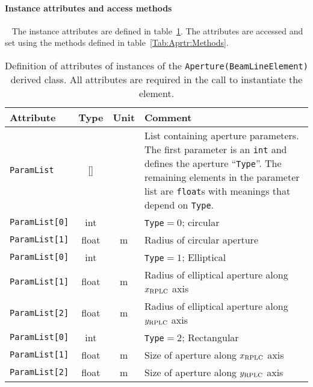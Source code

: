 \paragraph{Instance attributes and access methods} ~\newline
\label{SubSubSect:Aprtr:InstAttr}
\noindent
The instance attributes are defined in
table~\ref{Tab:Aprtr:Attributes}. 
The attributes are accessed and set using the methods defined in
table~\ref{Tab:Aprtr:Methods}.
\begin{table}[h]
  \caption{
    Definition of attributes of instances of
    the \texttt{Aperture(BeamLineElement)} derived class.
    All attributes are required in the call to instantiate the
    element.
  }
  \label{Tab:Aprtr:Attributes}
  \begin{center}
    \begin{tabular}{|l|c|c|p{10cm}|}
      \hline
      \textbf{Attribute}   & \textbf{Type} & \textbf{Unit} & \textbf{Comment}                                                                   \\
      \hline
      \texttt{ParamList}   & [] &   & List containing aperture parameters.
                                    The first parameter is an \texttt{int}
                                    and defines the aperture ``\texttt{Type}''.
                                    The remaining elements in the parameter list
                                    are \texttt{float}s with meanings that depend
                                    on \texttt{Type}.                             \\
      \hline
      \texttt{ParamList[0]} & int   &   & \texttt{Type}$=0$; circular                 \\
      \texttt{ParamList[1]} & float & m & Radius of circular aperture                 \\
      \hline
      \texttt{ParamList[0]} & int   &   & \texttt{Type}$=1$; Elliptical                           \\
      \texttt{ParamList[1]} & float & m & Radius of elliptical aperture along $x_{\rm RPLC}$ axis \\
      \texttt{ParamList[2]} & float & m & Radius of elliptical aperture along $y_{\rm RPLC}$ axis \\
      \hline
      \texttt{ParamList[0]} & int   &   & \texttt{Type}$=2$; Rectangular                         \\
      \texttt{ParamList[1]} & float & m & Size of aperture along $x_{\rm RPLC}$ axis \\
      \texttt{ParamList[2]} & float & m & Size of aperture along $y_{\rm RPLC}$ axis \\
      \hline
    \end{tabular}
  \end{center}
\end{table}

